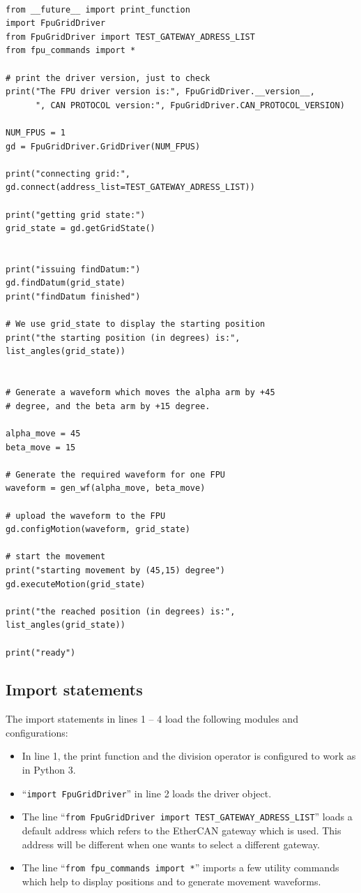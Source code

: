 \documentclass{scrartcl}[12pt,a4paper]
\begin{document}
\begin{verbatim}

from __future__ import print_function
import FpuGridDriver
from FpuGridDriver import TEST_GATEWAY_ADRESS_LIST
from fpu_commands import *

# print the driver version, just to check
print("The FPU driver version is:", FpuGridDriver.__version__,
      ", CAN PROTOCOL version:", FpuGridDriver.CAN_PROTOCOL_VERSION)

NUM_FPUS = 1
gd = FpuGridDriver.GridDriver(NUM_FPUS)

print("connecting grid:", gd.connect(address_list=TEST_GATEWAY_ADRESS_LIST))

print("getting grid state:")
grid_state = gd.getGridState()


print("issuing findDatum:")
gd.findDatum(grid_state)
print("findDatum finished")

# We use grid_state to display the starting position
print("the starting position (in degrees) is:", list_angles(grid_state))


# Generate a waveform which moves the alpha arm by +45
# degree, and the beta arm by +15 degree. 

alpha_move = 45
beta_move = 15

# Generate the required waveform for one FPU
waveform = gen_wf(alpha_move, beta_move)

# upload the waveform to the FPU
gd.configMotion(waveform, grid_state)

# start the movement
print("starting movement by (45,15) degree")
gd.executeMotion(grid_state)

print("the reached position (in degrees) is:", list_angles(grid_state))

print("ready")

\end{verbatim}


\subsection{Import statements}

The import statements in lines 1 -- 4 load the following modules and
configurations:

\begin{itemize}
\item In line 1, the print function and the division operator is
  configured to work as in Python 3.
  
\item ``\texttt{import FpuGridDriver}'' in line 2 loads the driver
  object.

\item The line ``\texttt{from FpuGridDriver import
  TEST\_GATEWAY\_ADRESS\_LIST}'' loads a default address which refers to
  the EtherCAN gateway which is used. This address will be different
  when one wants to select a different gateway.

\item The line ``\texttt{from fpu\_commands import *}'' imports a few
  utility commands which help to display positions and to generate
  movement waveforms.

 
\end{itemize}
\end{document}
